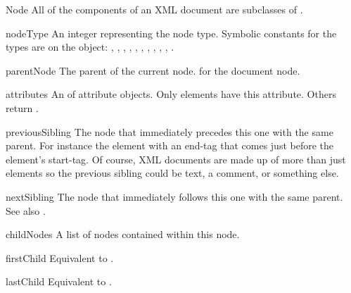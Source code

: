 \begin{classdesc}{Node}{}
All of the components of an XML document are subclasses of
.

\begin{memberdesc}{nodeType}
An integer representing the node type.  Symbolic constants for the
types are on the  object: ,
, ,
, ,
, ,
, ,
, .
\end{memberdesc}

\begin{memberdesc}{parentNode}
The parent of the current node.   for the document node.
\end{memberdesc}

\begin{memberdesc}{attributes}
An  of attribute objects.  Only
elements have this attribute.  Others return .
\end{memberdesc}

\begin{memberdesc}{previousSibling}
The node that immediately precedes this one with the same parent.  For
instance the element with an end-tag that comes just before the
 element's start-tag.  Of course, XML documents are made
up of more than just elements so the previous sibling could be text, a
comment, or something else.
\end{memberdesc}

\begin{memberdesc}{nextSibling}
The node that immediately follows this one with the same parent.  See
also .
\end{memberdesc}

\begin{memberdesc}{childNodes}
A list of nodes contained within this node.
\end{memberdesc}

\begin{memberdesc}{firstChild}
Equivalent to .
\end{memberdesc}

\begin{memberdesc}{lastChild}
Equivalent to .
\end{memberdesc}


\end{classdesc}
